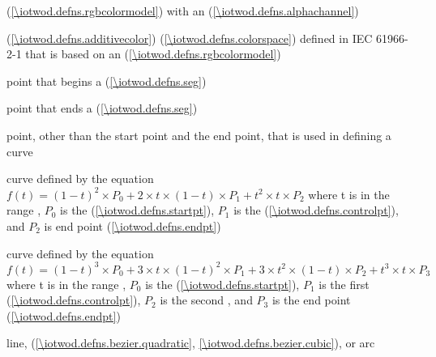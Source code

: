 %
%
  (\ref{\iotwod.defns.rgbcolormodel}) with an  (\ref{\iotwod.defns.alphachannel})

%
%
  (\ref{\iotwod.defns.additivecolor})  (\ref{\iotwod.defns.colorspace}) defined in IEC 61966-2-1 that is based on an  (\ref{\iotwod.defns.rgbcolormodel})

%
point that begins a  (\ref{\iotwod.defns.seg})

%
point that ends a  (\ref{\iotwod.defns.seg})

%
point, other than the start point and the end point, that is used in defining a curve

%
%
 curve defined by the 
equation $f(t) = (1 - t)^{2} \times P_{0} + 2 \times t \times (1 - t) 
\times P_{1} + t^{2} \times t \times P_{2}$ where t is in the range , $P_{0}$ is the  (\ref{\iotwod.defns.startpt}), $P_{1}$ is the  (\ref{\iotwod.defns.controlpt}), and $P_{2}$ is end point (\ref{\iotwod.defns.endpt})

 curve defined by the 
equation $f(t) = (1 - t)^{3} \times P_{0} + 3 \times t \times (1 - t)^{2} 
\times P_{1} + 3 \times t^{2} \times (1 - t) \times P_{2} + t^{3} \times t 
\times P_{3}$ where t is in the range , $P_{0}$ is the  (\ref{\iotwod.defns.startpt}), $P_{1}$ is the first  (\ref{\iotwod.defns.controlpt}), $P_{2}$ is the second , and $P_{3}$ is the end point (\ref{\iotwod.defns.endpt})

%
line,  (\ref{\iotwod.defns.bezier.quadratic}, \ref{\iotwod.defns.bezier.cubic}), or arc

